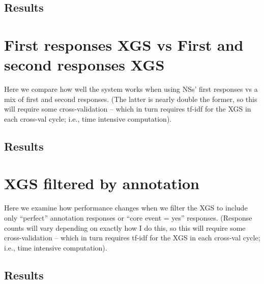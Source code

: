 \subsection{Results}
\label{subsection:crowdsource-results}

\section{First responses XGS vs First and second responses XGS}
\label{section:experiment-first-responses}
Here we compare how well the system works when using NSs' first responses vs a mix of first and second responses. (The latter is nearly double the former, so this will require some cross-validation -- which in turn requires tf-idf for the XGS in each cross-val cycle; i.e., time intensive computation).
\subsection{Results}
\label{subsection:first-responses-results}

\section{XGS filtered by annotation}
\label{section:experiment-filtered}
Here we examine how performance changes when we filter the XGS to include only ``perfect'' annotation responses or ``core event = yes'' responses. (Response counts will vary depending on exactly how I do this, so this will require some cross-validation -- which in turn requires tf-idf for the XGS in each cross-val cycle; i.e., time intensive computation).
\subsection{Results}
\label{subsection:filtered-results}
